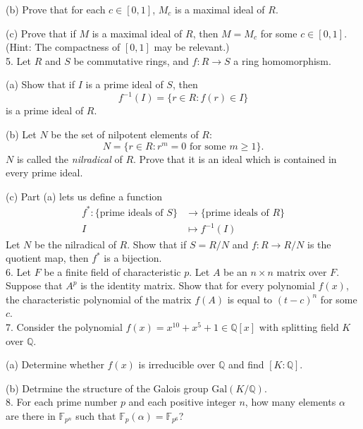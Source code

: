 \documentclass[11pt]{article}
\newcommand{\Q}{\mathbb{Q}}
\newcommand{\F}{\mathbb{F}}
\begin{document}
(b) Prove that for each $c\in [0,1]$, $M_c$ is a maximal ideal of $R$.

(c) Prove that if $M$ is a maximal ideal of $R$, then $M = M_c$ for some $c\in [0,1]$. (Hint: The compactness of $[0,1]$ may be relevant.) \\

5. Let $R$ and $S$ be commutative rings, and $f : R \to S$ a ring homomorphism.

(a) Show that if $I$ is a prime ideal of $S$, then\[
f^{-1}(I) = \{r \in R : f(r) \in I\}
\]
is a prime ideal of $R$.

(b) Let $N$ be the set of nilpotent elements of $R$:\[
N = \{r\in R : r^m = 0 \text{ for some } m \ge 1\}.\]
$N$ is called the \emph{nilradical} of $R$. Prove that it is an ideal which is contained in
every prime ideal.

(c) Part (a) lets us define a function\begin{align*}
f^* : \{\text{prime ideals of $S$}\} &\rightarrow \{\text{prime ideals of $R$}\}\\
I&\mapsto f^{-1}(I)
\end{align*}
Let $N$ be the nilradical of $R$. Show that if $S = R/N$ and $f : R \to R/N$ is the
quotient map, then $f^*$ is a bijection.\\


6. Let $F$ be a finite field of characteristic $p$. Let $A$ be an $n\times n$ matrix over $F$. Suppose that $A^p$ is the identity matrix. Show that for every polynomial $f(x)$, the characteristic polynomial of the matrix $f(A)$ is equal to $(t-c)^n$ for some $c$. \\

7. Consider the polynomial $f(x) = x^{10} + x^5 +1 \in\Q[x]$ with splitting field $K$ over $\Q$.

(a) Determine whether $f(x)$ is irreducible over $\Q$ and find $[K:\Q]$. 

(b) Detrmine the structure of the Galois group $\mbox{Gal}(K/\Q)$. \\

8. For each prime number $p$ and each positive integer $n$, how many elements $\alpha$ are there in $\F_{p^n}$ such that $\F_p(\alpha) = \F_{p^6}$? 
\end{document}
